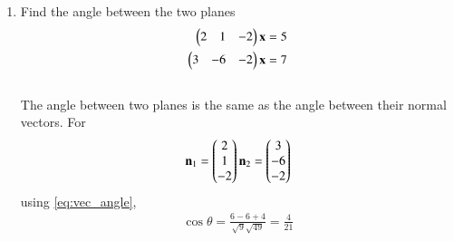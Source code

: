 \begin{enumerate}[label=\thesection.\arabic*.,ref=\thesection.\theenumi]
\item  Find the angle between the two planes 
\begin{align}
\begin{pmatrix} 2 & 1 & -2\end{pmatrix}\mathbf{x} &=5
\\
\begin{pmatrix} 3 & -6 & -2\end{pmatrix}\mathbf{x} &=7
\end{align}
\\
\solution
The angle between two planes is the same as the angle between their normal vectors.  For 
\begin{align}
\mathbf{n}_1 = \begin{pmatrix} 2 \\ 1 \\ -2\end{pmatrix}
\mathbf{n}_2 = \begin{pmatrix} 3 \\ -6 \\ -2\end{pmatrix}
\end{align}
using \eqref{eq:vec_angle}, 
\begin{align}
\cos \theta = \frac{6-6+4}{\sqrt{9}\sqrt{49}} = \frac{4}{21}
\end{align}
\end{enumerate}


